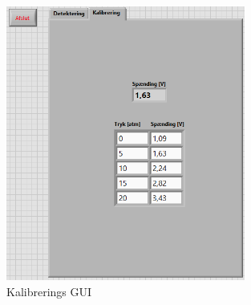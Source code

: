 \begin{figure}[H]
	\centering
	\includegraphics[width=0.7\textwidth]{Figure/kaliGUI}
	\caption{Kalibrerings GUI}
    \label{kaliGUI}
\end{figure}








